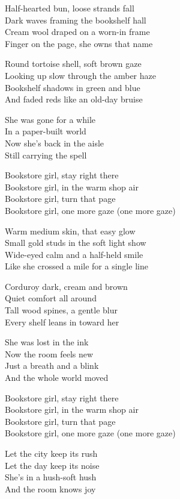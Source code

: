 \begin{lyrics}
Half-hearted bun, loose strands fall\\
Dark waves framing the bookshelf hall\\
Cream wool draped on a worn-in frame\\
Finger on the page, she owns that name

Round tortoise shell, soft brown gaze\\
Looking up slow through the amber haze\\
Bookshelf shadows in green and blue\\
And faded reds like an old-day bruise

She was gone for a while\\
In a paper-built world\\
Now she’s back in the aisle\\
Still carrying the spell

Bookstore girl, stay right there\\
Bookstore girl, in the warm shop air\\
Bookstore girl, turn that page\\
Bookstore girl, one more gaze (one more gaze)

Warm medium skin, that easy glow\\
Small gold studs in the soft light show\\
Wide-eyed calm and a half-held smile\\
Like she crossed a mile for a single line

Corduroy dark, cream and brown\\
Quiet comfort all around\\
Tall wood spines, a gentle blur\\
Every shelf leans in toward her

She was lost in the ink\\
Now the room feels new\\
Just a breath and a blink\\
And the whole world moved

Bookstore girl, stay right there\\
Bookstore girl, in the warm shop air\\
Bookstore girl, turn that page\\
Bookstore girl, one more gaze (one more gaze)

Let the city keep its rush\\
Let the day keep its noise\\
She’s in a hush-soft hush\\
And the room knows joy


\end{lyrics}
